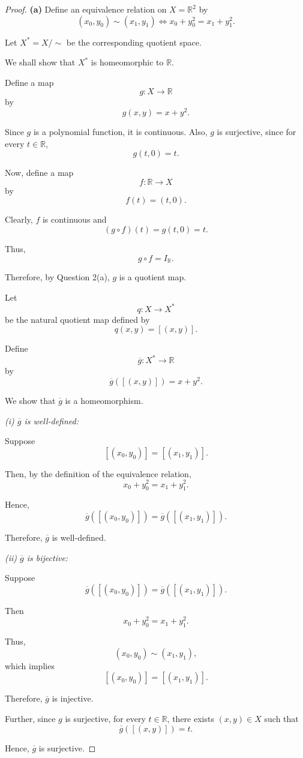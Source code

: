 \begin{proof}
\textbf{(a)} Define an equivalence relation on
\(X=\mathbb{R}^2\) by
\[
(x_0,y_0)\sim(x_1,y_1)
\iff x_0+y_0^2=x_1+y_1^2.
\]

Let \(X^*=X/\sim\) be the corresponding quotient space.

We shall show that \(X^*\) is homeomorphic to \(\mathbb{R}\).

Define a map
\[
g:X\to\mathbb{R}
\]
by
\[
g(x,y)=x+y^2.
\]

Since \(g\) is a polynomial function, it is continuous.
Also, \(g\) is surjective, since for every
\(t\in\mathbb{R}\),
\[
g(t,0)=t.
\]

Now, define a map
\[
f:\mathbb{R}\to X
\]
by
\[
f(t)=(t,0).
\]

Clearly, \(f\) is continuous and
\[
(g\circ f)(t)=g(t,0)=t.
\]

Thus,
\[
g\circ f=I_{\mathbb{R}}.
\]

Therefore, by Question 2(a), \(g\) is a quotient map.

Let
\[
q:X\to X^*
\]
be the natural quotient map defined by
\[
q(x,y)=[(x,y)].
\]

Define
\[
\overline{g}:X^*\to\mathbb{R}
\]
by
\[
\overline{g}([(x,y)])=x+y^2.
\]

We show that \(\overline{g}\) is a homeomorphism.

\textit{(i) \(\overline{g}\) is well-defined:}

Suppose
\[
[(x_0,y_0)]=[(x_1,y_1)].
\]

Then, by the definition of the equivalence relation,
\[
x_0+y_0^2=x_1+y_1^2.
\]

Hence,
\[
\overline{g}([(x_0,y_0)])
=
\overline{g}([(x_1,y_1)]).
\]

Therefore, \(\overline{g}\) is well-defined.

\textit{(ii) \(\overline{g}\) is bijective:}

Suppose
\[
\overline{g}([(x_0,y_0)])
=
\overline{g}([(x_1,y_1)]).
\]

Then
\[
x_0+y_0^2=x_1+y_1^2.
\]

Thus,
\[
(x_0,y_0)\sim(x_1,y_1),
\]
which implies
\[
[(x_0,y_0)]=[(x_1,y_1)].
\]

Therefore, \(\overline{g}\) is injective.

Further, since \(g\) is surjective, for every
\(t\in\mathbb{R}\), there exists \((x,y)\in X\)
such that
\[
\overline{g}([(x,y)])=t.
\]

Hence, \(\overline{g}\) is surjective.


\end{proof}
